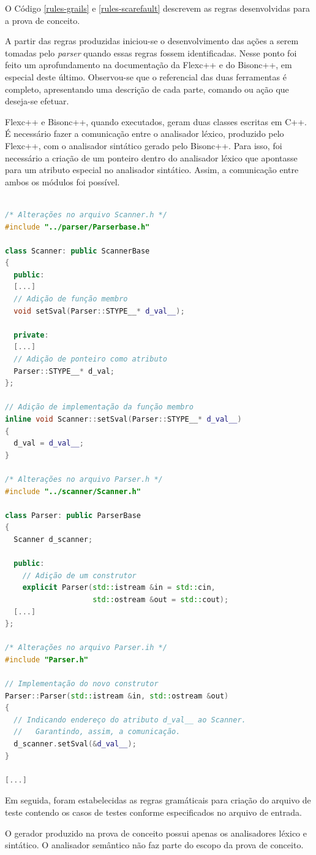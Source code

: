 \par
\indent O Código \ref{rules-grails} e \ref{rules-scarefault} descrevem as regras desenvolvidas para a prova de conceito.
\par
\indent A partir das regras produzidas iniciou-se o desenvolvimento das ações a serem tomadas pelo \textit{parser} quando essas regras fossem identificadas. Nesse ponto foi feito um aprofundamento na documentação da Flexc++ e do Bisonc++, em especial deste último. Observou-se que o referencial das duas ferramentas é completo, apresentando uma descrição de cada parte, comando ou ação que deseja-se efetuar.
\par
\indent Flexc++ e Bisonc++, quando executados, geram duas classes escritas em C++. É necessário fazer a comunicação entre o analisador léxico, produzido pelo Flexc++, com o analisador sintático gerado pelo Bisonc++. Para isso, foi necessário a criação de um ponteiro dentro do analisador léxico que apontasse para um atributo especial no analisador sintático. Assim, a comunicação entre ambos os módulos foi possível.
\begin{lstlisting}[language=C++, label=talk-lexer-grammar, caption=Comunicação Entre Analisador Léxico e Analisador Sintático]

/* Alterações no arquivo Scanner.h */
#include "../parser/Parserbase.h"

class Scanner: public ScannerBase
{
  public:
  [...]
  // Adição de função membro
  void setSval(Parser::STYPE__* d_val__);
  
  private:
  [...]
  // Adição de ponteiro como atributo
  Parser::STYPE__* d_val;
};

// Adição de implementação da função membro
inline void Scanner::setSval(Parser::STYPE__* d_val__)
{
  d_val = d_val__;
}

/* Alterações no arquivo Parser.h */
#include "../scanner/Scanner.h"

class Parser: public ParserBase
{
  Scanner d_scanner;
  
  public:
    // Adição de um construtor
    explicit Parser(std::istream &in = std::cin,
                    std::ostream &out = std::cout);
  [...]
};

/* Alterações no arquivo Parser.ih */
#include "Parser.h"

// Implementação do novo construtor
Parser::Parser(std::istream &in, std::ostream &out)
{
  // Indicando endereço do atributo d_val__ ao Scanner.
  //   Garantindo, assim, a comunicação.
  d_scanner.setSval(&d_val__);  
}

[...]

\end{lstlisting}
\par
\indent Em seguida, foram estabelecidas as regras gramáticais para criação do arquivo de teste contendo os casos de testes conforme especificados no arquivo de entrada.
\par 
\indent O gerador produzido na prova de conceito possui apenas os analisadores léxico e sintático. O analisador semântico não faz parte do escopo da prova de conceito.


